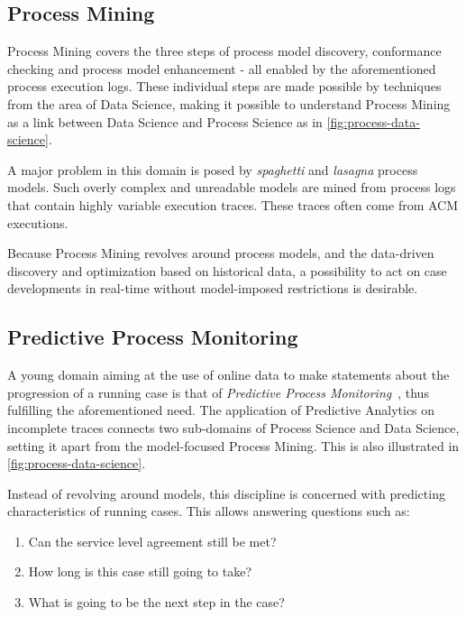 \subsection{Process Mining}\label{sec:process-mining}
Process Mining covers the three steps of process model discovery, conformance checking and process model enhancement \cite{Aalst2016} -  all enabled by the aforementioned process execution logs. These individual steps are made possible by techniques from the area of Data Science, making it possible to understand Process Mining as a link between Data Science and Process Science as in \autoref{fig:process-data-science}.

A major problem in this domain is posed by \textit{spaghetti} and \textit{lasagna} process models\cite{Aalst2016}. Such overly complex and unreadable models are mined from process logs that contain highly variable execution traces. These traces often come from ACM executions.

Because Process Mining revolves around process models, and the data-driven discovery and optimization based on historical data, a possibility to act on case developments in real-time without model-imposed restrictions is desirable.

\subsection{Predictive Process Monitoring}
\label{sec:predictive-process-monitoring}
A young domain aiming at the use of online data to make statements about the progression of a running case is that of \textit{Predictive Process Monitoring}~\cite{francescomarino2015, schoenig2018}, thus fulfilling the aforementioned need. The application of Predictive Analytics on incomplete traces connects two sub-domains of Process Science and Data Science, setting it apart from the model-focused Process Mining. This is also illustrated in \autoref{fig:process-data-science}.

Instead of revolving around models, this discipline is concerned with predicting characteristics of running cases. This allows answering questions such as:

\begin{enumerate}
    \item Can the service level agreement still be met?
    \item How long is this case still going to take?
    \item What is going to be the next step in the case?
\end{enumerate}

